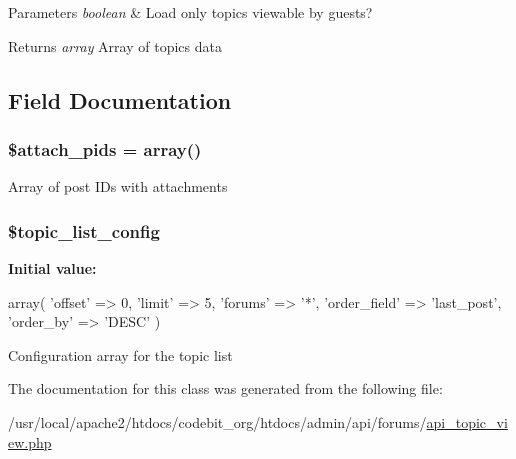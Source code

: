 \begin{DoxyParams}{Parameters}
{\em boolean} & Load only topics viewable by guests? \\
\hline
\end{DoxyParams}
\begin{DoxyReturn}{Returns}
{\itshape array} Array of topics data 
\end{DoxyReturn}


\subsection{Field Documentation}
\hypertarget{classapi_topic_view_a5934d8cb70f1818c80b753b23354f3b6}{
\subsubsection[{\$attach\-\_\-pids}]{\setlength{\rightskip}{0pt plus 5cm}\$attach\-\_\-pids = array()\hspace{0.3cm}{\ttfamily [protected]}}}\label{classapi_topic_view_a5934d8cb70f1818c80b753b23354f3b6}
Array of post I\-Ds with attachments \hypertarget{classapi_topic_view_af9d44ca8823257cb2c86a82d193c8b68}{
\subsubsection[{\$topic\-\_\-list\-\_\-config}]{\setlength{\rightskip}{0pt plus 5cm}\$topic\-\_\-list\-\_\-config}}\label{classapi_topic_view_af9d44ca8823257cb2c86a82d193c8b68}
{\bfseries Initial value\-:}
\begin{DoxyCode}
 array(  \textcolor{stringliteral}{'offset'}               => 0,
                                                                                \textcolor{stringliteral}{
      'limit'}                  => 5,
                                                                                \textcolor{stringliteral}{
      'forums'}         => \textcolor{charliteral}{'*'},
                                                                                \textcolor{stringliteral}{
      'order\_field'}    => \textcolor{stringliteral}{'last\_post'},
                                                                                \textcolor{stringliteral}{
      'order\_by'}               => \textcolor{stringliteral}{'DESC'}
                                                                          )
\end{DoxyCode}
Configuration array for the topic list 

The documentation for this class was generated from the following file\-:\begin{DoxyCompactItemize}
\item 
/usr/local/apache2/htdocs/codebit\-\_\-org/htdocs/admin/api/forums/\hyperlink{api__topic__view_8php}{api\-\_\-topic\-\_\-view.\-php}\end{DoxyCompactItemize}
